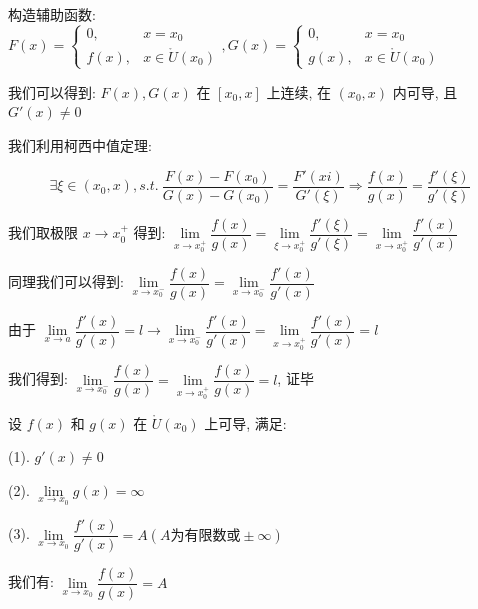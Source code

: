 \begin{anymark}[证明]
	构造辅助函数: $F(x) = \begin{cases} 0,& x=x_{0}  \\ f(x),&x\in\mathring{U}(x_{0}) \end{cases}, G(x)= \begin{cases} 0,& x=x_{0}  \\ g(x),&x\in\mathring{U}(x_{0}) \end{cases} $

	我们可以得到: $F(x),G(x)$ 在 $[x_{0},x]$ 上连续, 在 $(x_{0},x)$ 内可导, 且 $G'(x)\neq 0$
	
	我们利用柯西中值定理:
	
	$$\exists \xi\in (x_{0},x), s.t.\ \dfrac{F(x)-F(x_{0})}{G(x)-G(x_{0})}= \dfrac{F'(xi)}{G'(\xi)}\Rightarrow \dfrac{f(x)}{g(x)} = \dfrac{f'(\xi)}{g'(\xi)}$$

	我们取极限 $x\to x_{0}^{+}$ 得到: $\lim\limits_{x\to x_{0}^{+}}\dfrac{f(x)}{g(x)} = \lim\limits_{\xi\to x_{0}^{+}}\dfrac{f'(\xi)}{g'(\xi)} = \lim\limits_{x\to x_{0}^{+}}\dfrac{f'(x)}{g'(x)} $

	同理我们可以得到: $\lim\limits_{x\to x_{0}^{-}}\dfrac{f(x)}{g(x)} = \lim\limits_{x\to x_{0}^{-}}\dfrac{f'(x)}{g'(x)} $
	
	由于 $\lim\limits_{x\to a}\dfrac{f'(x)}{g'(x)}=l\to \lim\limits_{x\to x_{0}^{-}}\dfrac{f'(x)}{g'(x)} = \lim\limits_{x\to x_{0}^{+}}\dfrac{f'(x)}{g'(x)}=l$

	我们得到: $\lim\limits_{x\to x_{0}^{-}}\dfrac{f(x)}{g(x)} = \lim\limits_{x\to x_{0}^{+}}\dfrac{f(x)}{g(x)} = l$, 证毕
\end{anymark}
\begin{theorem}[广义洛必达定理]
	设 $f(x)$ 和 $g(x)$ 在 $\mathring{U}(x_{0})$ 上可导, 满足:

	(1). $g'(x)\neq 0$

	(2). $\lim\limits_{x\to x_{0}}g(x) =\infty$

	(3). $\lim\limits_{x\to x_{0}}\dfrac{f'(x)}{g'(x)}=A(A\text{为有限数或}\pm\infty)$

	我们有: $\lim\limits_{x\to x_{0}}\dfrac{f(x)}{g(x)}=A$
\end{theorem}
